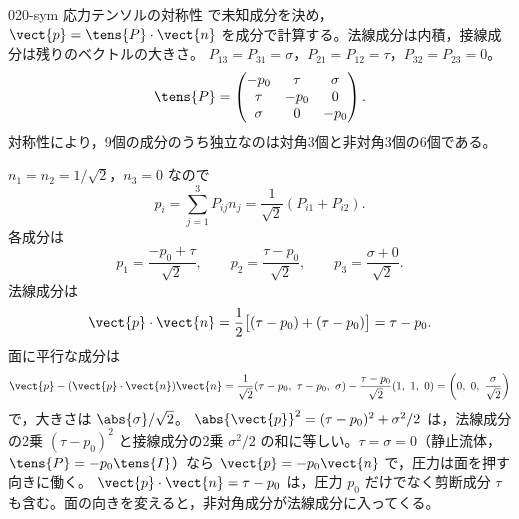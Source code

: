 \documentclass[uplatex,dvipdfmx,a4paper,11pt]{jsarticle}
\begin{document}
\begin{kaisetsu}{020-sym}
\houshin 応力テンソルの対称性  で未知成分を決め，$\vect{p}=\tens{P}\cdot\vect{n}$ を成分で計算する。法線成分は内積，接線成分は残りのベクトルの大きさ。
\keisan {} $P_{13}=P_{31}=\sigma$，$P_{21}=P_{12}=\tau$，$P_{32}=P_{23}=0$。
\[ \tens{P}=\begin{pmatrix} -p_0 & \tau & \sigma\\ \tau & -p_0 & 0\\ \sigma & 0 & -p_0 \end{pmatrix}. \]
対称性により，9個の成分のうち独立なのは対角3個と非対角3個の6個である。

 $n_1=n_2=1/\sqrt{2}$，$n_3=0$ なので
\[ p_i=\sum_{j=1}^{3}P_{ij}n_j=\frac{1}{\sqrt{2}}\left(P_{i1}+P_{i2}\right). \]
各成分は
\[ p_1=\frac{-p_0+\tau}{\sqrt{2}},\qquad p_2=\frac{\tau-p_0}{\sqrt{2}},\qquad p_3=\frac{\sigma+0}{\sqrt{2}}. \]
 法線成分は
\[ \vect{p}\cdot\vect{n}=\frac{1}{2}\bigl[(\tau-p_0)+(\tau-p_0)\bigr]=\tau-p_0. \]
面に平行な成分は
\[ \vect{p}-(\vect{p}\cdot\vect{n})\vect{n}=\frac{1}{\sqrt{2}}(\tau-p_0,\ \tau-p_0,\ \sigma)-\frac{\tau-p_0}{\sqrt{2}}(1,\ 1,\ 0)=\left(0,\ 0,\ \frac{\sigma}{\sqrt{2}}\right) \]
で，大きさは $\abs{\sigma}/\sqrt{2}$。
\kenzan $\abs{\vect{p}}^{2}=(\tau-p_0)^{2}+\sigma^{2}/2$ は，法線成分の2乗 $(\tau-p_0)^{2}$ と接線成分の2乗 $\sigma^{2}/2$ の和に等しい。$\tau=\sigma=0$（静止流体，$\tens{P}=-p_0\tens{I}$）なら $\vect{p}=-p_0\vect{n}$ で，圧力は面を押す向きに働く。
\tsumazuki $\vect{p}\cdot\vect{n}=\tau-p_0$ は，圧力 $p_0$ だけでなく剪断成分 $\tau$ も含む。面の向きを変えると，非対角成分が法線成分に入ってくる。
\end{kaisetsu}
\end{document}
